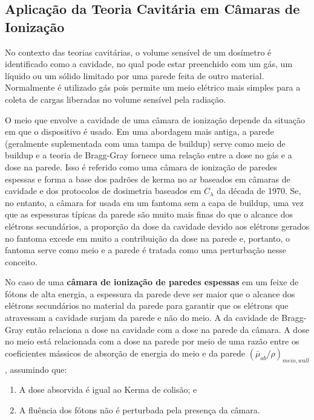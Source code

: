 \documentclass[11pt,a4paper]{article}
\begin{document}
		\subsection{Aplicação da Teoria Cavitária em Câmaras de Ionização}

			No contexto das teorias cavitárias, o volume sensível de um dosímetro é identificado como a cavidade, no qual pode estar preenchido com um gás, um líquido ou um sólido limitado por uma parede feita de outro material. Normalmente é utilizado gás pois permite um meio elétrico mais simples para a coleta de cargas liberadas no volume sensível pela radiação. 

			O meio que envolve a cavidade de uma câmara de ionização depende da situação em que o dispositivo é usado. Em uma abordagem mais antiga, a parede (geralmente suplementada com uma tampa de buildup) serve como meio de buildup e a teoria de Bragg-Gray fornece uma relação entre a dose no gás e a dose na parede. Isso é referido como uma câmara de ionização de paredes espessas e forma a base dos padrões de kerma no ar baseados em câmaras de cavidade e dos protocolos de dosimetria baseados em $C_\lambda$ da década de 1970. Se, no entanto, a câmara for usada em um fantoma sem a capa de buildup, uma vez que as espessuras típicas da parede são muito mais finas do que o alcance dos elétrons secundários, a proporção da dose da cavidade devido aos elétrons gerados no fantoma excede em muito a contribuição da dose na parede e, portanto, o fantoma serve como meio e a parede é tratada como uma perturbação nesse conceito.

			No caso de uma \textbf{\textcolor{CarnationPink}{câmara de ionização de paredes espessas}} em um feixe de fótons de alta energia, a espessura da parede deve ser maior que o alcance dos elétrons secundários no material da parede para garantir que os elétrons que atravessam a cavidade surjam da parede e não do meio. A   da cavidade de Bragg-Gray então relaciona a dose na cavidade com a dose na parede da câmara. A dose no meio está relacionada com a dose na parede por meio de uma razão entre os coeficientes mássicos de absorção de energia do meio e da parede $(\bar{\mu}_{ab}/\rho)_{meio, wall}$, assumindo que:

			\begin{enumerate}
				\item A dose absorvida é igual ao Kerma de colisão; e
				\item A fluência dos fótons não é perturbada pela presença da câmara.
			\end{enumerate}
\end{document}
